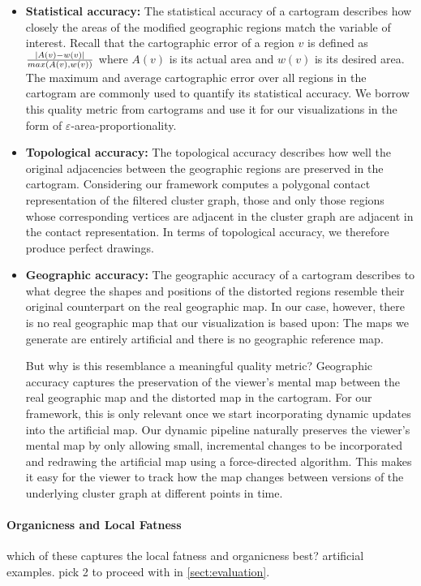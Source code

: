 \begin{itemize}
\item \textbf{Statistical accuracy:}
The statistical accuracy of a cartogram describes how closely the areas of the modified geographic regions match the variable of interest.
Recall that the cartographic error of a region $v$ is defined as $\frac{\left\lvert A(v)-w(v)\right\rvert}{max(A(v),w(v))}$ where $A(v)$ is its actual area and $w(v)$ is its desired area.
The maximum and average cartographic error over all regions in the cartogram are commonly used to quantify its statistical accuracy.
We borrow this quality metric from cartograms and use it for our visualizations in the form of $\varepsilon$-area-proportionality.

\item \textbf{Topological accuracy:}
The topological accuracy describes how well the original adjacencies between the geographic regions are preserved in the cartogram.
Considering our framework computes a polygonal contact representation of the filtered cluster graph, those and only those regions whose corresponding vertices are adjacent in the cluster graph are adjacent in the contact representation.
In terms of topological accuracy, we therefore produce perfect drawings.

\item \textbf{Geographic accuracy:}
The geographic accuracy of a cartogram describes to what degree the shapes and positions of the distorted regions resemble their original counterpart on the real geographic map.
In our case, however, there is no real geographic map that our visualization is based upon:
The maps we generate are entirely artificial and there is no geographic reference map.

But why is this resemblance a meaningful quality metric?
Geographic accuracy captures the preservation of the viewer's mental map between the real geographic map and the distorted map in the cartogram.
For our framework, this is only relevant once we start incorporating dynamic updates into the artificial map.
Our dynamic pipeline naturally preserves the viewer's mental map by only allowing small, incremental changes to be incorporated and redrawing the artificial map using a force-directed algorithm.
This makes it easy for the viewer to track how the map changes between versions of the underlying cluster graph at different points in time.
\end{itemize}



\paragraph{Organicness and Local Fatness}






which of these captures the local fatness and organicness best? artificial examples. pick 2 to proceed with in \cref{sect:evaluation}.